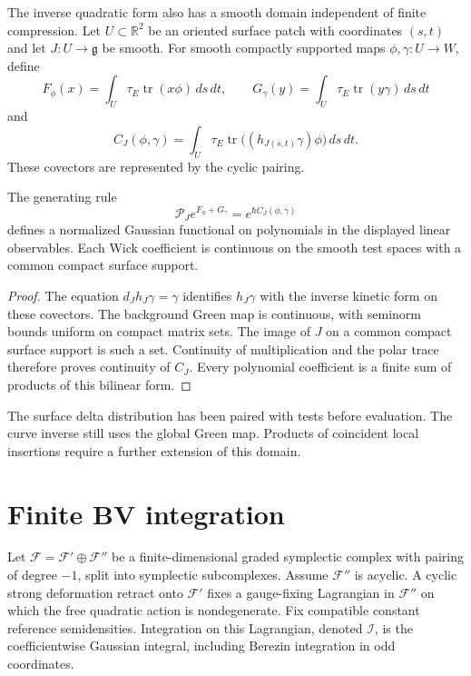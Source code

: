 The inverse quadratic form also has a smooth domain independent of
finite compression. Let $U\subset\mathbb R^2$ be an oriented surface
patch with coordinates $(s,t)$ and let $J:U\to\mathfrak g$ be smooth.
For smooth compactly supported maps $\phi,\gamma:U\to W$, define
\[
 F_\phi(x)=\int_U\tau_E\operatorname{tr}(x\phi)\,ds\,dt,
 \qquad
 G_\gamma(y)=\int_U\tau_E\operatorname{tr}(y\gamma)\,ds\,dt
\]
and
\[
 C_J(\phi,\gamma)=\int_U\tau_E\operatorname{tr}
                   \bigl((h_{J(s,t)}\gamma)\phi\bigr)\,ds\,dt.
\]
These covectors are represented by the cyclic pairing.

\begin{proposition}\label{mht:prop:smooth-gaussian-observables}
The generating rule
\[
 \mathcal P_J e^{F_\phi+G_\gamma}
       =e^{\hbar C_J(\phi,\gamma)}
\]
defines a normalized Gaussian functional on polynomials in the
displayed linear observables. Each Wick coefficient is continuous
on the smooth test spaces with a common compact surface support.
\end{proposition}

\begin{proof}
The equation $d_Jh_J\gamma=\gamma$ identifies $h_J\gamma$ with the
inverse kinetic form on these covectors. The background Green map
is continuous, with seminorm bounds uniform on compact matrix sets.
The image of $J$ on a common compact surface support is such a set.
Continuity of multiplication and the polar trace therefore proves
continuity of $C_J$. Every polynomial coefficient is a finite sum
of products of this bilinear form.
\end{proof}

The surface delta distribution has been paired with tests before
evaluation. The curve inverse still uses the global Green map.
Products of coincident local insertions require a further extension
of this domain.

\section{Finite BV integration}

Let $\mathcal F=\mathcal F'\oplus\mathcal F''$ be a finite-dimensional
graded symplectic complex with pairing of degree $-1$, split into
symplectic subcomplexes. Assume $\mathcal F''$ is acyclic. A cyclic
strong deformation retract onto $\mathcal F'$ fixes a gauge-fixing
Lagrangian in $\mathcal F''$ on which the free quadratic action is
nondegenerate. Fix compatible constant reference semidensities.
Integration on this Lagrangian, denoted $\mathcal I$, is the
coefficientwise Gaussian integral, including Berezin integration
in odd coordinates.

